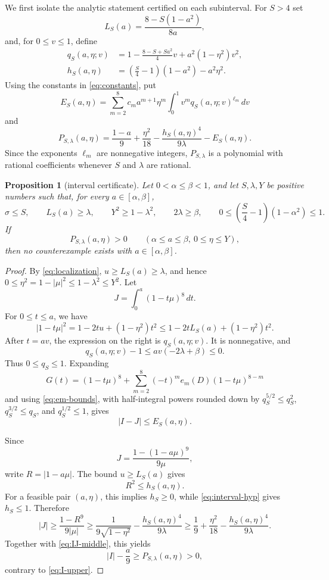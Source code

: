 \documentclass[11pt]{article}
\newtheorem{proposition}[theorem]{Proposition}
\theoremstyle{remark}
\begin{document}
We first isolate the analytic statement certified on each subinterval.  For
$S>4$ set
\[
 L_S(a)=\frac{8-S(1-a^2)}{8a},
\]
and, for $0\le v\le1$, define
\begin{align}
 q_S(a,\eta;v)
 &=1-\frac{8-S+Sa^2}{4}v+a^2(1-\eta^2)v^2,\label{eq:qS}\\
 h_S(a,\eta)
 &=\left(\frac S4-1\right)(1-a^2)-a^2\eta^2.\label{eq:hS}
\end{align}
Using the constants in \eqref{eq:constants}, put
\begin{equation}\label{eq:ES}
 E_S(a,\eta)=
 \sum_{m=2}^{8}c_m a^{m+1}\eta^m
 \int_0^1 v^m q_S(a,\eta;v)^{\ell_m}\,dv
\end{equation}
and
\begin{equation}\label{eq:PS}
 P_{S,\lambda}(a,\eta)=
 \frac{1-a}{9}+\frac{\eta^2}{18}
 -\frac{h_S(a,\eta)^4}{9\lambda}-E_S(a,\eta).
\end{equation}
Since the exponents $\ell_m$ are nonnegative integers,
$P_{S,\lambda}$ is a polynomial with rational coefficients whenever
$S$ and $\lambda$ are rational.

\begin{proposition}[interval certificate]\label{prop:interval}
Let $0<\alpha\le\beta<1$, and let $S,\lambda,Y$ be positive numbers such that,
for every $a\in[\alpha,\beta]$,
\begin{equation}\label{eq:interval-hyp}
 \sigma\le S,
 \qquad L_S(a)\ge\lambda,
 \qquad Y^2\ge1-\lambda^2,
 \qquad 2\lambda\ge\beta,
 \qquad
 0\le\left(\frac S4-1\right)(1-\alpha^2)\le1.
\end{equation}
If
\[
 P_{S,\lambda}(a,\eta)>0
 \qquad
 (\alpha\le a\le\beta,\ 0\le\eta\le Y),
\]
then no counterexample exists with $a\in[\alpha,\beta]$.
\end{proposition}

\begin{proof}
By \eqref{eq:localization}, $u\ge L_S(a)\ge\lambda$, and hence
$0\le\eta^2=1-|\mu|^2\le1-\lambda^2\le Y^2$.
Let
\[
 J=\int_0^a(1-t\mu)^8\,dt.
\]
For $0\le t\le a$, we have
\[
 |1-t\mu|^2=1-2tu+(1-\eta^2)t^2
 \le1-2tL_S(a)+(1-\eta^2)t^2.
\]
After $t=av$, the expression on the right is $q_S(a,\eta;v)$.  It is
nonnegative, and
\[
 q_S(a,\eta;v)-1
 \le av(-2\lambda+\beta)\le0.
\]
Thus $0\le q_S\le1$.  Expanding
\[
 G(t)=(1-t\mu)^8+
 \sum_{m=2}^{8}(-t)^m e_m(D)(1-t\mu)^{8-m}
\]
and using \eqref{eq:em-bounds}, with half-integral powers rounded down by
$q_S^{5/2}\le q_S^2$, $q_S^{3/2}\le q_S$, and
$q_S^{1/2}\le1$, gives
\begin{equation}\label{eq:IJ-middle}
 |I-J|\le E_S(a,\eta).
\end{equation}

Since
\[
 J=\frac{1-(1-a\mu)^9}{9\mu},
\]
write $R=|1-a\mu|$.  The bound $u\ge L_S(a)$ gives
\[
 R^2\le h_S(a,\eta).
\]
For a feasible pair $(a,\eta)$, this implies $h_S\ge0$, while
\eqref{eq:interval-hyp} gives $h_S\le1$.  Therefore
\[
 |J|\ge\frac{1-R^9}{9|\mu|}
 \ge\frac1{9\sqrt{1-\eta^2}}-
 \frac{h_S(a,\eta)^4}{9\lambda}
 \ge\frac19+\frac{\eta^2}{18}-
 \frac{h_S(a,\eta)^4}{9\lambda}.
\]
Together with \eqref{eq:IJ-middle}, this yields
\[
 |I|-\frac a9\ge P_{S,\lambda}(a,\eta)>0,
\]
contrary to \eqref{eq:I-upper}.
\end{proof}
\end{document}
